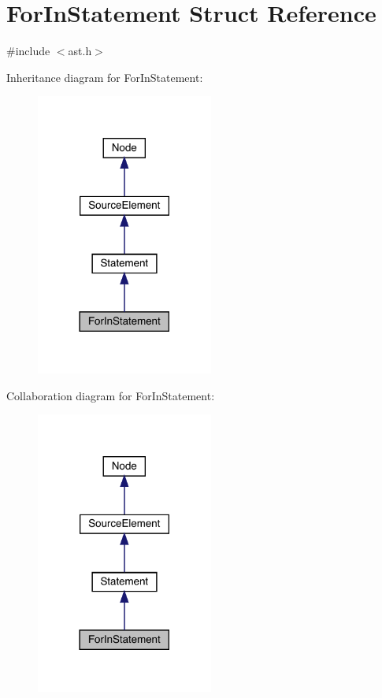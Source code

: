 \hypertarget{struct_for_in_statement}{}\section{For\+In\+Statement Struct Reference}
\label{struct_for_in_statement}


{\ttfamily \#include $<$ast.\+h$>$}



Inheritance diagram for For\+In\+Statement\+:\nopagebreak
\begin{figure}[H]
\begin{center}
\leavevmode
\includegraphics[width=165pt]{struct_for_in_statement__inherit__graph}
\end{center}
\end{figure}


Collaboration diagram for For\+In\+Statement\+:\nopagebreak
\begin{figure}[H]
\begin{center}
\leavevmode
\includegraphics[width=165pt]{struct_for_in_statement__coll__graph}
\end{center}
\end{figure}

